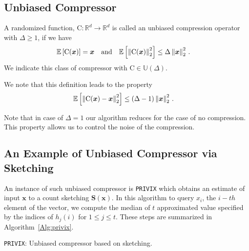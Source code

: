\subsection{Unbiased Compressor}
\begin{definition}
A randomized function, $\text{C}:\mathbb{R}^{d}\rightarrow\mathbb{R}^{d}$ is called an unbiased compression operator with $\Delta\geq 1$, if we have 
\begin{align}\notag
\mathbb{E}\left[\text{C}(\boldsymbol{x})\right]&=\boldsymbol{x}\nonumber \quad \textrm{and} \quad    \mathbb{E}\left[\left\|\text{C}(\boldsymbol{x})\right\|^2_2\right] \leq \Delta\left\|\boldsymbol{x}\right\|^2_2\notag \, .
\end{align}
We indicate this class of compressor with $\text{C}\in\mathbb{U}(\Delta)$.
\end{definition}
We note that this definition leads to the property 
\begin{align}\notag
    \mathbb{E}\left[\left\|\text{C}(\boldsymbol{x})-\boldsymbol{x}\right\|^2_2\right]&\leq \left(\Delta-1\right)\left\|\boldsymbol{x}\right\|^2_2\, .
\end{align}
\begin{remark}
Note that in case of $\Delta=1$ our algorithm reduces for the case of no compression. This property allows us to control the noise of the compression.
\end{remark}

\subsection{An Example of Unbiased Compressor via Sketching}
An instance of such unbiased compressor is \texttt{PRIVIX} which obtains an estimate of input $\boldsymbol{x}$ to a count sketching $\boldsymbol{S}(\boldsymbol{x})$. In this algorithm to query $x_i$, the $i-th$ element of the vector, we compute the median of $t$ approximated value specified by the indices of $h_j(i)$ for $1\leq j\leq t$. These steps are summarized in Algorithm~\ref{Alg:privix}.

\begin{algorithm}[t]
\caption{\texttt{PRIVIX}\cite{li2019privacy}: Unbiased compressor based on sketching. }\label{Alg:privix}
\begin{algorithmic}[1]
\vspace{- 0.1cm}
\end{algorithmic}
\end{algorithm}
 
